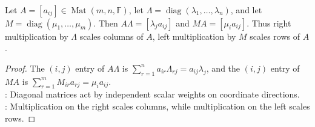 \begin{proposition} \label{prop:diagonal-multiplication-scales-rows-columns} \\
Let $A=[a_{ij}]\in\operatorname{Mat}(m,n,\mathbb{F})$, let $\Lambda=\operatorname{diag}(\lambda_1,\ldots,\lambda_n)$, and let $M=\operatorname{diag}(\mu_1,\ldots,\mu_m)$. Then $A\Lambda=[\lambda_j a_{ij}]$ and $MA=[\mu_i a_{ij}]$. Thus right multiplication by $\Lambda$ scales columns of $A$, left multiplication by $M$ scales rows of $A$.
\begin{proof}
The $(i,j)$ entry of $A\Lambda$ is $\sum_{r=1}^n a_{ir}\Lambda_{rj}=a_{ij}\lambda_j$, and the $(i,j)$ entry of $MA$ is $\sum_{r=1}^m M_{ir}a_{rj}=\mu_i a_{ij}$.\\
: Diagonal matrices act by independent scalar weights on coordinate directions.\\
: Multiplication on the right scales columns, while multiplication on the left scales rows.
\end{proof}
\end{proposition}

